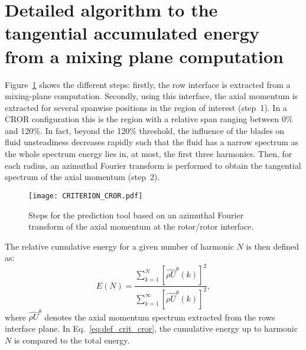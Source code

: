 \section{Detailed algorithm to the tangential accumulated energy from a mixing plane computation}
\label{app:epsilon_cror_steps}
Figure~\ref{fig:criterion_cror} shows the different steps: firstly, the row
interface is extracted from a mixing-plane computation.
Secondly, using this interface,
the axial momentum is extracted for several spanwise positions in the region of interest
(step~\textcircled{\small{1}}).
In a CROR configuration this is the region with a 
relative span ranging between 0\% and 120\%.
In fact, beyond the 120\% threshold, the influence of the blades on fluid
unsteadiness decreases rapidly such that the fluid 
has a narrow spectrum as the whole spectrum energy lies in, at
most, the first three harmonics.
Then, for each radius, an azimuthal Fourier transform
is performed to obtain the tangential spectrum of the
axial momentum (step~\textcircled{\small{2}}).
\begin{figure}[htp]
  \centering
  \texttt{[image: CRITERION\_CROR.pdf]}
  \caption{Steps for the prediction tool based on an azimuthal
  Fourier transform of the axial momentum at the rotor/rotor interface.}
  \label{fig:criterion_cror}
\end{figure}
The relative cumulative energy for a given number of harmonic $N$ is then defined as:
\begin{equation}
    E (N) = \frac{\sum_{k=1}^N \left[ \widehat{\rho U}^{\theta} (k) \right]^2}{ 
    \sum_{k=1}^\infty \left[ \widehat{\rho U}^{\theta} (k) \right]^2},
    \label{eq:def_crit_cror}
\end{equation} 
where $\widehat{\rho U}^{\theta}$ denotes the axial momentum spectrum
extracted from the rows interface plane. In Eq.~\eqref{eq:def_crit_cror},
the cumulative energy up to harmonic $N$ is 
compared to the total energy.
